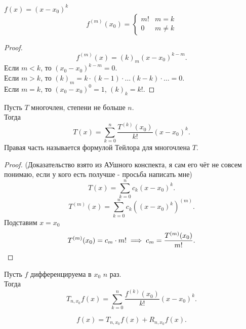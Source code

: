 \documentclass[11pt, oneside]{article}   	%
\begin{document}
    \begin{tlemma}
        $f(x) = (x-x_0)^{k}$
        \begin{equation*}
            f^{(m)}(x_0) = \begin{cases}
                m! & m = k\\
                0 & m \neq k
            \end{cases}
        \end{equation*}
        \begin{proof}
            \[ f^{(m)}(x) = (k)_{m}(x-x_0)^{k-m} .\]
            Если $m<k$, то $(x_0-x_0)^{k-m} = 0$.\\
            Если $m>k$, то $(k)_m = k\cdot (k-1) \cdot \ldots (k-k) \cdot \ldots = 0$.\\
            Если $m=k$, то $(x_0-x_0)^{0} = 1$, $(k)_{k} = k!$.
        \end{proof}
    \end{tlemma}
    \begin{theorem}
        Пусть $T$ многочлен, степени не больше $n$.\\
        Тогда
        \[ T(x) = \sum\limits_{k=0}^{n} \frac{T^{(k)}(x_0)}{k!}(x-x_0)^{k} .\]
        Правая часть называется формулой Тейлора для многочлена $T$.\\
        \begin{proof}
            (Доказательство взято из АУшного конспекта, я сам его чёт не совсем понимаю, если у кого есть получше - просьба написать мне)
            \[ T(x) = \sum\limits_{k=0}^{n} c_k(x-x_0)^{k} .\]
            \[ T^{(m)}(x) = \sum\limits_{k=0}^{n} c_{k}((x-x_0)^{k})^{(m)} .\]
            Подставим $x=x_0$
            \[ T^{(m)}(x_0) = c_m \cdot m! \implies c_{m} = \frac{T^{(m)}(x_0)}{m!} .\qedhere\] 
        \end{proof}
    \end{theorem}
    \begin{definition}
        Пусть $f$ дифференцируема в $x_0$ $n$ раз.\\
        Тогда
        \[ T_{n, x_0}f(x) = \sum\limits_{k=0}^{n} \frac{f^{(k)}(x_0)}{k!}(x-x_0)^{k} .\] 
    \end{definition}
    \begin{definition}
        \[ f(x) = T_{n, x_0}f(x) + R_{n, x_0} f(x) .\] 
    \end{definition}
\end{document}
